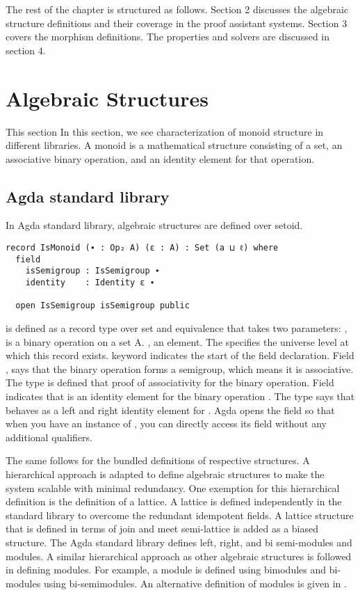 The rest of the chapter is structured as follows. Section 2 discusses the
algebraic structure definitions and their coverage in the proof assistant
systems. Section 3 covers the morphism definitions. The properties and solvers
are discussed in section 4. 

\section{Algebraic Structures}
\label{algebraic_structure}
This section In this section, we see characterization of monoid structure in
different libraries. A monoid is a mathematical structure consisting of a set,
an associative binary operation, and an identity element for that operation.

\subsection{Agda standard library}
In Agda standard library, algebraic structures are defined over setoid.

\begin{verbatim}
record IsMonoid (∙ : Op₂ A) (ε : A) : Set (a ⊔ ℓ) where
  field
    isSemigroup : IsSemigroup ∙
    identity    : Identity ε ∙

  open IsSemigroup isSemigroup public
\end{verbatim}

 is defined as a record type over set  and
equivalence  that takes two parameters: , is a binary
operation  on a set A. , an element. The  specifies the universe level at which this record exists. 
keyword indicates the start of the field declaration. Field
, says that the binary operation  forms a
semigroup, which means it is associative. The  type is
defined that proof of associativity for the binary operation. Field
 indicates that  is an identity element for the
binary operation . The  type says that 
behaves as a left and right identity element for .  Agda  opens the
 field  so that when you have an
instance of , you can directly access its 
field without any additional qualifiers.

The same follows for the bundled definitions of respective structures. A
hierarchical approach is adapted to define algebraic structures to make the
system scalable with minimal redundancy. One exemption for this hierarchical
definition is the definition of a lattice. A lattice is defined independently in
the standard library to overcome the redundant idempotent fields. A lattice
structure that is defined in terms of join and meet semi-lattice is added as a
biased structure. The Agda standard library defines left, right, and bi
semi-modules and modules. A similar hierarchical approach as other algebraic
structures is followed in defining modules. For example, a module is defined
using bimodules and bi-modules using bi-semimodules. An alternative definition
of modules is given in .

